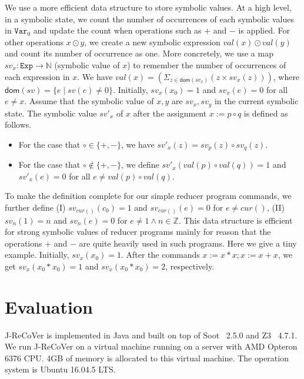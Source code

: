 \documentclass{llncs}
\newcommand{\Var}{\mathtt{Var}}
\newcommand{\Exp}{\mathtt{Exp}}
\newcommand{\cur}{cur()}
\newcommand{\dom}[1]{\mathsf{dom}(#1)}
\newcommand{\Z}{\mathbb{Z}}
\begin{document}
We use a more efficient data structure to store symbolic values. At a high level, in a symbolic state, we count the number of occurrences of each symbolic values in $\Var_0$ and update the count when operations such as $+$ and $-$ is applied. For other operations $x\odot y$, we create a new symbolic expression $val(x) \odot val(y)$ and count its number of occurrence as one.
More concretely, we use a map $sv_x:\Exp\rightarrow \mathbb{N}$ (symbolic value of $x$) to remember the number of occurrences of each expression in $x$. We have $val(x)= (\Sigma_{z\in \dom{sv_x}} (z\times sv_x(z)) )$, where $\dom{sv}=\{e\mid sv(e)\neq 0\}$.
Initially, $sv_x(x_0) = 1$ and $sv_x (e) =0$ for all $e\neq x$. Assume that the symbolic value of $x,y$ are $sv_x,sv_y$ in the current symbolic state. The symbolic value $sv'_x$ of $x$ after the assignment $x:=p\circ q$ is defined as follows.

\begin{itemize}
	\item For the case that $\circ \in\{+,-\}$, we have $sv'_x(z) = sv_p(z)\circ  sv_q(z)$.
	\item For the case that $\circ \notin\{+,-\}$, we define $sv'_x(val(p) \circ val(q)) =1$ and $sv'_x(e) = 0$ for all $e\neq val(p) \circ val(q)$.
\end{itemize}
To make the definition complete for our simple reducer program commands, we further define (I) $sv_{\cur}(c_0) =1$ and $sv_{\cur}(e)=0$ for $e\neq \cur$, (II) $sv_{n}(1) =n$ and $sv_{n}(e)=0$ for $e\neq 1 \wedge n\in \Z$.
This data structure is efficient for strong symbolic values of reducer programs mainly for reason that the operations $+$ and $-$ are quite heavily used in such programs.
Here we give a tiny example. Initially, $sv_x(x_0)=1$. After the commands $x:=x*x;x:=x+x$, we get $sv_x(x_0*x_0)=1$ and $sv_x(x_0*x_0)=2$, respectively.

\section{Evaluation}
\label{section:exp}
J-ReCoVer is implemented in Java and built on top of Soot~\cite{soot} 2.5.0 and Z3~\cite{z3} 4.7.1. We run J-ReCoVer on a virtual machine running on a server with AMD Opteron 6376 CPU. 4GB of memory is allocated to this virtual machine. The operation system is Ubuntu 16.04.5 LTS.
\end{document}

